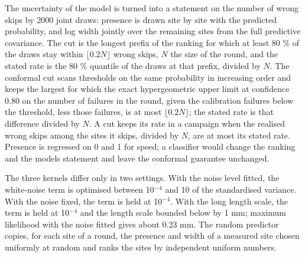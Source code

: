 \documentclass{iopjournal}
\begin{document}
The uncertainty of the model is turned into a statement on the number of wrong skips by 2000 joint draws: presence is drawn site by site with the predicted probability, and log width jointly over the remaining sites from the full predictive covariance. The cut is the longest prefix of the ranking for which at least 80 \% of the draws stay within \(\lfloor 0.2 N \rfloor\) wrong skips, \(N\) the size of the round, and the stated rate is the 80 \% quantile of the draws at that prefix, divided by \(N\). The conformal cut scans thresholds on the same probability in increasing order and keeps the largest for which the exact hypergeometric upper limit at confidence 0.80 on the number of failures in the round, given the calibration failures below the threshold, less those failures, is at most \(\lfloor 0.2 N \rfloor\); the stated rate is that difference divided by \(N\). A cut keeps its rate in a campaign when the realised wrong skips among the sites it skips, divided by \(N\), are at most its stated rate. Presence is regressed on 0 and 1 for speed; a classifier would change the ranking and the model\textquotesingle s statement and leave the conformal guarantee unchanged.

The three kernels differ only in two settings. With the noise level fitted, the white-noise term is optimised between 10\ensuremath{^{-}}\ensuremath{^{4}} and 10 of the standardised variance. With the noise fixed, the term is held at 10\ensuremath{^{-}}\ensuremath{^{4}}. With the long length scale, the term is held at 10\ensuremath{^{-}}\ensuremath{^{4}} and the length scale bounded below by 1 mm; maximum likelihood with the noise fitted gives about 0.23 mm. The random predictor copies, for each site of a round, the presence and width of a measured site chosen uniformly at random and ranks the sites by independent uniform numbers.
\end{document}
